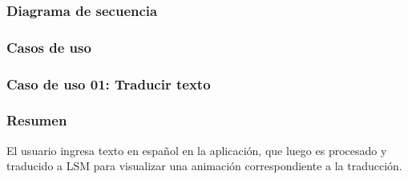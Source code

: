 \subsubsection{Diagrama de secuencia}
\begin{center}
\end{center}

\subsubsection{Casos de uso}
\subsubsection{Caso de uso 01: Traducir texto}
\subsubsection{Resumen}
El usuario ingresa texto en español en la aplicación, que luego es procesado y traducido a LSM para visualizar una animación correspondiente a la traducción.
